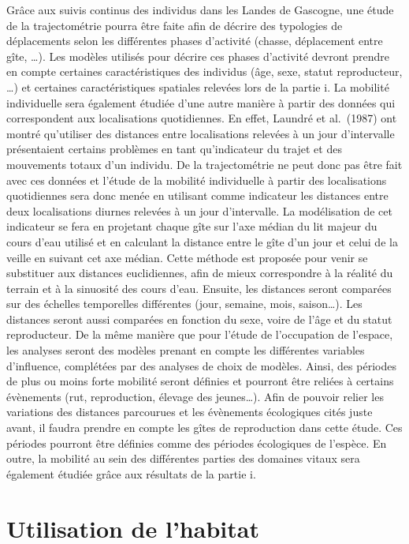 \documentclass[
  letterpaper,
  DIV=11,
  numbers=noendperiod]{scrreprt}
\begin{document}
Grâce aux suivis continus des individus dans les Landes de Gascogne, une
étude de la trajectométrie pourra être faite afin de décrire des
typologies de déplacements selon les différentes phases d'activité
(chasse, déplacement entre gîte, \ldots). Les modèles utilisés pour
décrire ces phases d'activité devront prendre en compte certaines
caractéristiques des individus (âge, sexe, statut reproducteur, \ldots)
et certaines caractéristiques spatiales relevées lors de la partie i. La
mobilité individuelle sera également étudiée d'une autre manière à
partir des données qui correspondent aux localisations quotidiennes. En
effet, Laundré et al.~(1987) ont montré qu'utiliser des distances entre
localisations relevées à un jour d'intervalle présentaient certains
problèmes en tant qu'indicateur du trajet et des mouvements totaux d'un
individu. De la trajectométrie ne peut donc pas être fait avec ces
données et l'étude de la mobilité individuelle à partir des
localisations quotidiennes sera donc menée en utilisant comme indicateur
les distances entre deux localisations diurnes relevées à un jour
d'intervalle. La modélisation de cet indicateur se fera en projetant
chaque gîte sur l'axe médian du lit majeur du cours d'eau utilisé et en
calculant la distance entre le gîte d'un jour et celui de la veille en
suivant cet axe médian. Cette méthode est proposée pour venir se
substituer aux distances euclidiennes, afin de mieux correspondre à la
réalité du terrain et à la sinuosité des cours d'eau. Ensuite, les
distances seront comparées sur des échelles temporelles différentes
(jour, semaine, mois, saison\ldots). Les distances seront aussi
comparées en fonction du sexe, voire de l'âge et du statut reproducteur.
De la même manière que pour l'étude de l'occupation de l'espace, les
analyses seront des modèles prenant en compte les différentes variables
d'influence, complétées par des analyses de choix de modèles. Ainsi, des
périodes de plus ou moins forte mobilité seront définies et pourront
être reliées à certains évènements (rut, reproduction, élevage des
jeunes\ldots). Afin de pouvoir relier les variations des distances
parcourues et les évènements écologiques cités juste avant, il faudra
prendre en compte les gîtes de reproduction dans cette étude. Ces
périodes pourront être définies comme des périodes écologiques de
l'espèce. En outre, la mobilité au sein des différentes parties des
domaines vitaux sera également étudiée grâce aux résultats de la partie
i.

\section{Utilisation de l'habitat}\label{utilisation-de-lhabitat}
\end{document}
